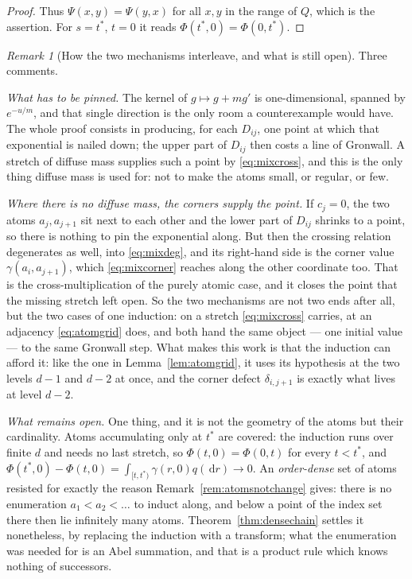 \documentclass[11pt,a4paper]{article}
\theoremstyle{plain}
\theoremstyle{definition}
\theoremstyle{remark}
\newtheorem{remark}[theorem]{Remark}
\newcommand{\dif}{\,\mathrm{d}}
\begin{document}
\begin{proof}
  Thus $\Psi(x,y) = \Psi(y,x)$ for all $x,y$ in the range of $Q$, which is the
  assertion.  For $s = t^*$, $t = 0$ it reads $\Phi(t^*,0) = \Phi(0,t^*)$.
\end{proof}

\begin{remark}[How the two mechanisms interleave, and what is still open]
  \label{rem:mixeddual}
  Three comments.

  \emph{What has to be pinned.}  The kernel of $g \mapsto g + m g'$ is
  one-dimensional, spanned by $e^{-u/m}$, and that single direction is the only
  room a counterexample would have.  The whole proof consists in producing, for
  each $D_{ij}$, one point at which that exponential is nailed down; the upper
  part of $D_{ij}$ then costs a line of Gronwall.  A stretch of diffuse mass
  supplies such a point by \eqref{eq:mixcross}, and this is the only thing
  diffuse mass is used for: not to make the atoms small, or regular, or few.

  \emph{Where there is no diffuse mass, the corners supply the point.}  If
  $c_j = 0$, the two atoms $a_j, a_{j+1}$ sit next to each other and the lower
  part of $D_{ij}$ shrinks to a point, so there is nothing to pin the
  exponential along.  But then the crossing relation degenerates as well, into
  \eqref{eq:mixdeg}, and its right-hand side is the corner value
  $\gamma(a_i,a_{j+1})$, which \eqref{eq:mixcorner} reaches along the other
  coordinate too.  That is the cross-multiplication of the purely atomic case,
  and it closes the point that the missing stretch left open.  So the two
  mechanisms are not two ends after all, but the two cases of one induction: on
  a stretch \eqref{eq:mixcross} carries, at an adjacency \eqref{eq:atomgrid}
  does, and both hand the same object --- one initial value --- to the same
  Gronwall step.  What makes this work is that the induction can afford it: like
  the one in Lemma~\ref{lem:atomgrid}, it uses its hypothesis at the two levels
  $d-1$ and $d-2$ at once, and the corner defect $\delta_{i,j+1}$ is exactly
  what lives at level $d-2$.

  \emph{What remains open.}  One thing, and it is not the geometry of the atoms
  but their cardinality.  Atoms accumulating only at $t^*$ are covered: the
  induction runs over finite $d$ and needs no last stretch, so
  $\Phi(t,0) = \Phi(0,t)$ for every $t < t^*$, and
  $\Phi(t^*,0) - \Phi(t,0) = \int_{[t,t^*)} \gamma(r,0) q(\dif r) \to 0$.  An
  \emph{order-dense} set of atoms resisted for exactly the reason
  Remark~\ref{rem:atomsnotchange} gives: there is no enumeration
  $a_1 < a_2 < \dots$ to induct along, and below a point of the index set there
  then lie infinitely many atoms.  Theorem~\ref{thm:densechain} settles it
  nonetheless, by replacing the induction with a transform; what the enumeration
  was needed for is an Abel summation, and that is a product rule which knows
  nothing of successors.
\end{remark}
\end{document}
